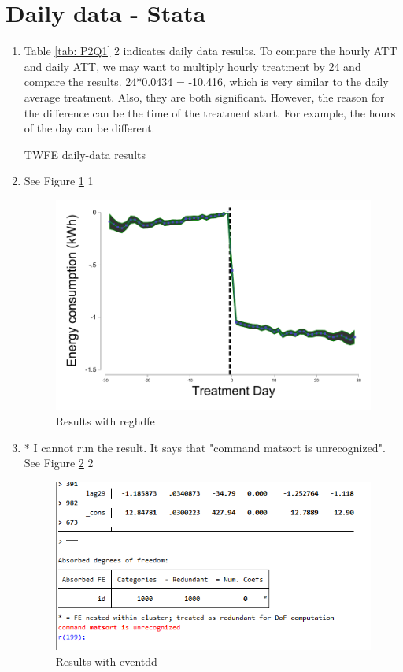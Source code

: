 \documentclass{article}
\begin{document}
\section{Daily data - Stata}
\begin{enumerate}

\item 

Table \ref{tab: P2Q1} 2 indicates daily data results. To compare the hourly ATT and daily ATT, we may want to multiply hourly treatment by 24 and compare the results. 24*0.0434 = -10.416, which is very similar to the daily average treatment. Also, they are both significant. However, the reason for the difference can be the time of the treatment start. For example, the hours of the day can be different. 

\begin{table}[ht]
    \centering
    
    \caption{TWFE daily-data results}
    \label{tab:P2Q1}
\end{table}

\item 
See Figure \ref{fig:P2Q1} 1
\begin{figure}[ht]
    \centering
    \includegraphics[scale = 0.7]{P2Graph1.pdf}
    \caption{Results with reghdfe}
    \label{fig:P2Q1}
\end{figure}


\item 
* I cannot run the result. It says that "command matsort is unrecognized". 
See Figure \ref{fig:P2Q2} 2
\begin{figure}[ht]
    \centering
    \includegraphics[scale = 0.7]{PSQ2.png}
    \caption{Results with eventdd}
    \label{fig:P2Q2}
\end{figure}


\end{enumerate}
\end{document}
